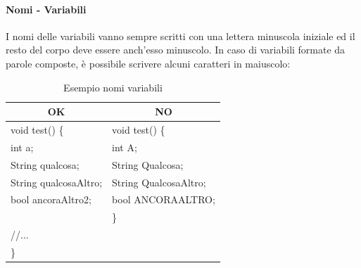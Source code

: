 \paragraph{Nomi - Variabili}
I nomi delle variabili vanno sempre scritti con una lettera minuscola iniziale ed il resto del corpo deve essere anch’esso minuscolo. In caso di variabili formate da parole composte, è possibile scrivere alcuni caratteri in maiuscolo:
\begin{table} [H]
		\begin{center}
			\begin{tabular}{ | l | l |}
				\multicolumn{1}{c}{\textbf{OK}}&\multicolumn{1}{c}{\textbf{NO}}\\ 
				\hline
				void test() \{
				&void test() \{\\
				\hspace{0.5cm}int a;
				&\hspace{0.5cm}int A;\\
				\hspace{0.5cm}String qualcosa;
				&\hspace{0.5cm}String Qualcosa;\\
				\hspace{0.5cm}String qualcosaAltro;
				&\hspace{0.5cm}String QualcosaAltro;\\
				\hspace{0.5cm}bool ancoraAltro2;
				&\hspace{0.5cm}bool ANCORAALTRO;\\
				&\}\\
				\hspace{0.5cm}//...									&
				\\
				\}&\\
				\hline
			\end{tabular}
		\end{center}
		\caption{Esempio nomi variabili}
\end{table}
	
